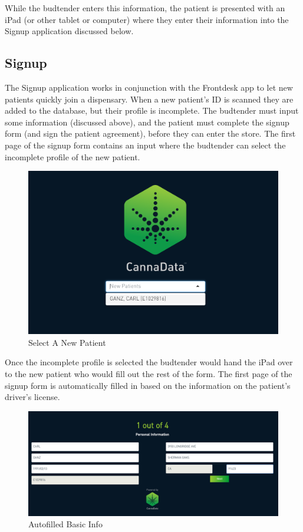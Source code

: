 \documentclass[]{book}
\theoremstyle{definition}
\theoremstyle{definition}
\theoremstyle{definition}
\theoremstyle{remark}
\begin{document}
While the budtender enters this information, the patient is presented
with an iPad (or other tablet or computer) where they enter their
information into the Signup application discussed below.

\subsection{Signup}\label{signup}

The Signup application works in conjunction with the Frontdesk app to
let new patients quickly join a dispensary. When a new patient's ID is
scanned they are added to the database, but their profile is incomplete.
The budtender must input some information (discussed above), and the
patient must complete the signup form (and sign the patient agreement),
before they can enter the store. The first page of the signup form
contains an input where the budtender can select the incomplete profile
of the new patient.

\begin{figure}
\centering
\includegraphics{images/S1.png}
\caption{Select A New Patient}
\end{figure}

Once the incomplete profile is selected the budtender would hand the
iPad over to the new patient who would fill out the rest of the form.
The first page of the signup form is automatically filled in based on
the information on the patient's driver's license.

\begin{figure}
\centering
\includegraphics{images/S2.png}
\caption{Autofilled Basic Info}
\end{figure}
\end{document}
